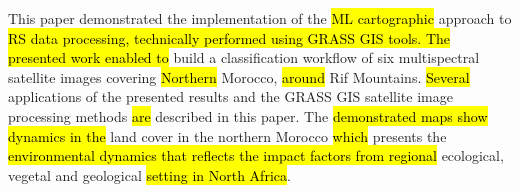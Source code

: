\documentclass[geomatics,article,submit,pdftex,moreauthors]{Definitions/mdpi}
\begin{document}
This paper demonstrated the implementation of the \hl{ML cartographic} approach to \hl{RS data processing, technically performed using GRASS GIS tools. The presented work enabled to }build a\hl{ }classification workflow of six multispectral satellite images covering\hl{ Northern} Morocco, \hl{around }Rif Mountains. \hl{Several} applications of the presented results and the GRASS GIS satellite image processing methods \hl{are }described in this paper. The \hl{demonstrated maps show dynamics in the }land cover in the northern\hl{ }Morocco \hl{which }presents the \hl{environmental dynamics that reflects the impact factors from regional }ecological, vegetal and geological \hl{setting in North Africa}.







\end{document}
